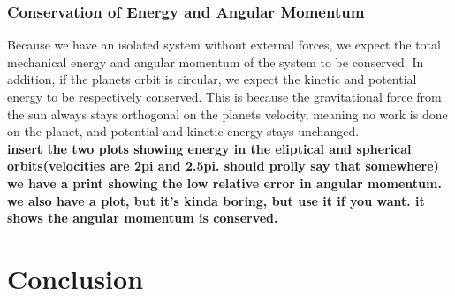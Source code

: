 \documentclass[a4paper]{article}
\begin{document}
\subsubsection{Conservation of Energy and Angular Momentum}
Because we have an isolated system without external forces, we expect the total mechanical energy and angular momentum of the system to be conserved. In addition, if the planets orbit is circular, we expect the kinetic and potential energy to be respectively conserved. This is because the gravitational force from the sun always stays orthogonal on the planets velocity, meaning no work is done on the planet, and potential and kinetic energy stays unchanged.\\
\textbf{insert the two plots showing energy in the eliptical and spherical orbits(velocities are 2pi and 2.5pi. should prolly say that somewhere)}\\
\textbf{we have a print showing the low relative error in angular momentum. we also have a plot, but it's kinda boring, but use it if you want. it shows the angular momentum is conserved.}

\section{Conclusion}\label{sec:conclusion}


%
%

{}
\end{document}
